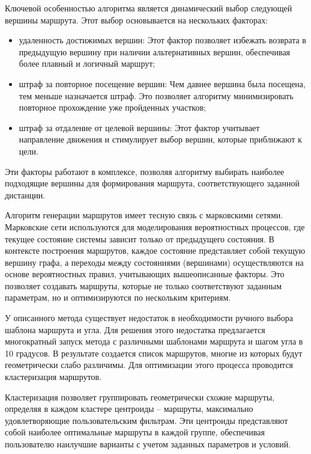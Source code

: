 Ключевой особенностью алгоритма является динамический выбор следующей вершины маршрута. Этот выбор основывается на нескольких факторах:

\begin{itemize}
\item удаленность достижимых вершин: Этот фактор позволяет избежать возврата в предыдущую вершину при наличии альтернативных вершин, обеспечивая более плавный и логичный маршрут;
\item штраф за повторное посещение вершин: Чем давнее вершина была посещена, тем меньше назначается штраф. Это позволяет алгоритму минимизировать повторное прохождение уже пройденных участков;
\item штраф за отдаление от целевой вершины: Этот фактор учитывает направление движения и стимулирует выбор вершин, которые приближают к цели.
\end{itemize}

Эти факторы работают в комплексе, позволяя алгоритму выбирать наиболее подходящие вершины для формирования маршрута, соответствующего заданной дистанции.

Алгоритм генерации маршрутов имеет тесную связь с марковскими сетями. Марковские сети используются для моделирования вероятностных процессов, где текущее состояние системы зависит только от предыдущего состояния. В контексте построения маршрутов, каждое состояние представляет собой текущую вершину графа, а переходы между состояниями (вершинами) осуществляются на основе вероятностных правил, учитывающих вышеописанные факторы. Это позволяет создавать маршруты, которые не только соответствуют заданным параметрам, но и оптимизируются по нескольким критериям.

У описанного метода существует недостаток в необходимости ручного выбора шаблона маршрута и угла. Для решения этого недостатка предлагается многократный запуск метода с различными шаблонами маршрута и шагом угла в 10 градусов. В результате создается список маршрутов, многие из которых будут геометрически слабо различимы. Для оптимизации этого процесса проводится кластеризация маршрутов.

Кластеризация позволяет группировать геометрически схожие маршруты, определяя в каждом кластере центроиды – маршруты, максимально удовлетворяющие пользовательским фильтрам. Эти центроиды представляют собой наиболее оптимальные маршруты в каждой группе, обеспечивая пользователю наилучшие варианты с учетом заданных параметров и условий.

